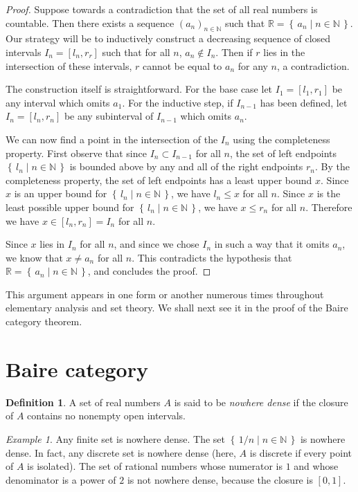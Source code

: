 \documentclass[11pt,oneside]{amsart}
\newcommand{\set}[1]{\left\{\,#1\,\right\}}
\newcommand{\NN}{\mathbb N}
\newcommand{\RR}{\mathbb R}
\theoremstyle{definition}
\newtheorem{defn}[thm]{Definition}
\theoremstyle{remark}
\newtheorem{example}[thm]{Example}
\begin{document}
\begin{proof}
  Suppose towards a contradiction that the set of all real numbers is countable. Then there exists a sequence $(a_n)_{n\in\NN}$ such that $\RR=\set{a_n\mid n\in\NN}$. Our strategy will be to inductively construct a decreasing sequence of closed intervals $I_n=[l_n,r_r]$ such that for all $n$, $a_n\notin I_n$. Then if $r$ lies in the intersection of these intervals, $r$ cannot be equal to $a_n$ for any $n$, a contradiction.

The construction itself is straightforward. For the base case let $I_1=[l_1,r_1]$ be any interval which omits $a_1$. For the inductive step, if $I_{n-1}$ has been defined, let $I_n=[l_n,r_n]$ be any subinterval of $I_{n-1}$ which omits $a_n$.

We can now find a point in the intersection of the $I_n$ using the completeness property. First observe that since $I_n\subset I_{n-1}$ for all $n$, the set of left endpoints $\set{l_n\mid n\in\NN}$ is bounded above by any and all of the right endpoints $r_n$. By the completeness property, the set of left endpoints has a least upper bound $x$. Since $x$ is an upper bound for $\set{l_n\mid n\in\NN}$, we have $l_n\leq x$ for all $n$. Since $x$ is the least possible upper bound for $\set{l_n\mid n\in\NN}$, we have $x\leq r_n$ for all $n$. Therefore we have $x\in[l_n,r_n]=I_n$ for all $n$.

Since $x$ lies in $I_n$ for all $n$, and since we chose $I_n$ in such a way that it omits $a_n$, we know that $x\neq a_n$ for all $n$. This contradicts the hypothesis that $\RR=\set{a_n\mid n\in\NN}$, and concludes the proof.
\end{proof}

This argument appears in one form or another numerous times throughout elementary analysis and set theory. We shall next see it in the proof of the Baire category theorem.

\section{Baire category}

\begin{defn}
  A set of real numbers $A$ is said to be \emph{nowhere dense} if the closure of $A$ contains no nonempty open intervals.
\end{defn}

\begin{example}
  Any finite set is nowhere dense. The set $\set{1/n\mid n\in\NN}$ is nowhere dense. In fact, any discrete set is nowhere dense (here, $A$ is discrete if every point of $A$ is isolated). The set of rational numbers whose numerator is $1$ and whose denominator is a power of $2$ is not nowhere dense, because the closure is $[0,1]$.
\end{example}
\end{document}
